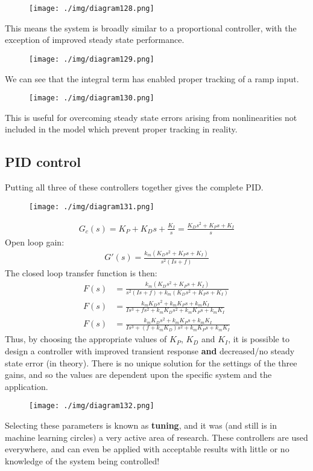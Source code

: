 \begin{figure}[H]
  \centerline{\texttt{[image: ./img/diagram128.png]}}
  \caption{}
\end{figure}
This means the system is broadly similar to a proportional controller, with the exception of improved steady state performance.
\begin{figure}[H]
  \centerline{\texttt{[image: ./img/diagram129.png]}}
  \caption{}
\end{figure}
We can see that the integral term has enabled proper tracking of a ramp input.
\begin{figure}[H]
  \centerline{\texttt{[image: ./img/diagram130.png]}}
  \caption{}
\end{figure}
This is useful for overcoming steady state errors arising from nonlinearities not included in the model which prevent proper tracking in reality.
\subsection{PID control}
Putting all three of these controllers together gives the complete PID.
\begin{figure}[H]
  \centerline{\texttt{[image: ./img/diagram131.png]}}
  \caption{}
\end{figure}
\begin{align}
  G_c (s) = K_P + K_D s + \frac{K_I}{s} = \frac{K_D s^2 + K_P s + K_I}{s}
\end{align}
Open loop gain:
\begin{align}
  G'(s) = \frac{k_m \left( K_D s^2 + K_P s + K_I \right)}{s^2 \left( Is + f \right)}
\end{align}
The closed loop transfer function is then:
\begin{align}
  F(s) & = \frac{k_m \left(K_D s^2 + K_P s + K_I\right)}{s^2 \left( Is + f\right) + k_m \left(K_D s^2 + K_P s +K_I \right)} \\
  F(s) & = \frac{k_m K_D s^2 + k_m K_P s + k_m K_I}{Is^3 + fs^2 + k_m K_D s^2 + k_m K_P s + k_m K_I}                        \\
  F(s) & = \frac{k_m K_D s^2 + k_m K_P s + k_m K_I}{Is^3 + \left( f +k_m K_D\right) s^2 + k_m K_P s + k_m K_I}
\end{align}
Thus, by choosing the appropriate values of $K_P$, $K_D$ and $K_I$, it is possible to design a controller with improved transient response \textbf{and} decreased/no steady state error (in theory). There is no unique solution for the settings of the three gains, and so the values are dependent upon the specific system and the application.
\begin{figure}[H]
  \centerline{\texttt{[image: ./img/diagram132.png]}}
  \caption{}
\end{figure}
Selecting these parameters is known as \textbf{tuning}, and it was (and still is in machine learning circles) a very active area of research. These controllers are used everywhere, and can even be applied with acceptable results with little or no knowledge of the system being controlled!

